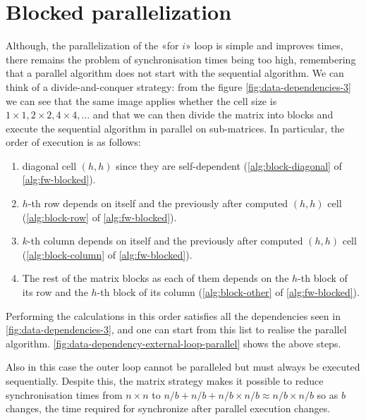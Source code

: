 \section{Blocked parallelization}\label{blocked_parallelization}

Although, the parallelization of the «for \(i\)» loop is simple and improves times, there remains the problem of synchronisation times being too high, remembering that a parallel algorithm does not start with the sequential algorithm.
We can think of a divide-and-conquer strategy: from the figure \cref{fig:data-dependencies-3} we can see that the same image applies whether the cell size is \(1 \times 1,  2 \times 2,  4 \times 4, \dots\) and that we can then divide the matrix into blocks and execute the sequential algorithm in parallel on sub-matrices.
In particular, the order of execution is as follows:
\begin{enumerate}
    \item diagonal cell \((h,h)\) since they are self-dependent (\cref{alg:block-diagonal} of \cref{alg:fw-blocked}).
    \item \(h\)-th row depends on itself and the previously after computed  \((h,h)\) cell (\cref{alg:block-row}  of \cref{alg:fw-blocked}).
    \item \(k\)-th column depends on itself and the previously after computed  \((h,h)\) cell (\cref{alg:block-column}  of \cref{alg:fw-blocked}).
    \item The rest of the matrix blocks as each of them depends on the \(h\)-th block of its row and the \(h\)-th block of its column (\cref{alg:block-other}  of \cref{alg:fw-blocked}).
\end{enumerate}

Performing the calculations in this order satisfies all the dependencies seen in \cref{fig:data-dependencies-3}, and one can start from this list to realise the parallel algorithm. \cref{fig:data-dependency-external-loop-parallel} shows the above steps.

Also in this case the outer loop cannot be paralleled but must always be executed sequentially.
Despite this, the matrix strategy makes it possible to reduce synchronisation times from \(n\times n\) to \(n/b + n/b + n/b \times n/b \approx n/b \times n/b\) so as \(b\) changes, the time required for synchronize after parallel execution changes.


